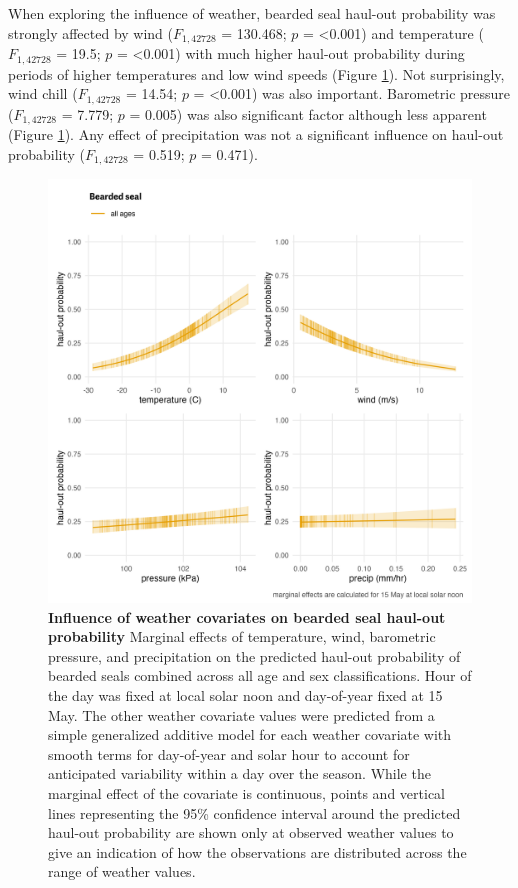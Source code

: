 \documentclass[fleqn,10pt,lineno]{wlpeerj} %
\begin{document}
When exploring the influence of weather, bearded seal haul-out probability
was strongly affected by wind
(\(F_{1,42728}\)
= 130.468; \(p\) = \textless0.001)
and temperature
(\(F_{1,42728}\)
= 19.5; \(p\) =
\textless0.001) with much higher haul-out probability during
periods of higher temperatures and low wind speeds (Figure \ref{fig:beardedHOwx}).
Not surprisingly, wind chill
(\(F_{1,42728}\)
= 14.54; \(p\) =
\textless0.001) was also important. Barometric
pressure (\(F_{1,42728}\)
= 7.779; \(p\) =
0.005) was also significant factor although less
apparent (Figure \ref{fig:beardedHOwx}). Any effect of precipitation
was not a significant influence on haul-out probability
(\(F_{1,42728}\)
= 0.519; \(p\) =
0.471).



\begin{figure}
\includegraphics[width=1\linewidth]{../figures/Figure-006} \caption{\textbf{Influence of weather covariates on bearded seal haul-out probability} \linebreak Marginal effects of temperature, wind, barometric pressure, and precipitation on the predicted haul-out probability of bearded seals combined across all age and sex classifications. Hour of the day was fixed at local solar noon and day-of-year fixed at 15 May. The other weather covariate values were predicted from a simple generalized additive model for each weather covariate with smooth terms for day-of-year and solar hour to account for anticipated variability within a day over the season. While the marginal effect of the covariate is continuous, points and vertical lines representing the 95\% confidence interval around the predicted haul-out probability are shown only at observed weather values to give an indication of how the observations are distributed across the range of weather values.}\label{fig:beardedHOwx}
\end{figure}
\end{document}
